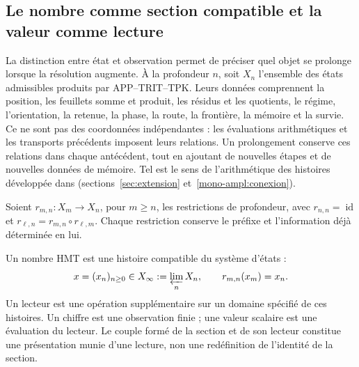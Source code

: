 
\subsection{Le nombre comme section compatible et la valeur comme lecture}
\label{hist:seccion}

La distinction entre état et observation permet de préciser quel objet se
prolonge lorsque la résolution augmente. À la profondeur \(n\), soit \(X_n\)
l’ensemble des états admissibles produits par APP--TRIT--TPK. Leurs données
comprennent la position, les feuillets somme et produit, les résidus et les quotients, le régime,
l’orientation, la retenue, la phase, la route, la frontière, la mémoire et la survie. Ce ne sont pas
des coordonnées indépendantes : les évaluations arithmétiques et les transports
précédents imposent leurs relations. Un prolongement conserve ces relations
dans chaque antécédent, tout en ajoutant de nouvelles étapes et de nouvelles données de mémoire.
Tel est le sens de l’arithmétique des histoires développée dans
(sections~\ref{sec:extension} et~\ref{mono-ampl:conexion}).

Soient \(r_{m,n}:X_m\to X_n\), pour \(m\geq n\), les restrictions de
profondeur, avec \(r_{n,n}=\operatorname{id}\) et
\(r_{\ell,n}=r_{m,n}\circ r_{\ell,m}\). Chaque restriction conserve le
préfixe et l’information déjà déterminée en lui.

\begin{definition}
Un nombre HMT est une histoire compatible du système d’états :
\begin{equation}
 x=(x_n)_{n\geq0}\in X_\infty:=\varprojlim_n X_n,
 \qquad r_{m,n}(x_m)=x_n.
 \label{hist:limite-inverso}
\end{equation}
Un lecteur est une opération supplémentaire sur un domaine spécifié de ces
histoires. Un chiffre est une observation finie ; une valeur scalaire est une
évaluation du lecteur. Le couple formé de la section et de son lecteur constitue
une présentation munie d’une lecture, non une redéfinition de l’identité de la section.
\end{definition}


